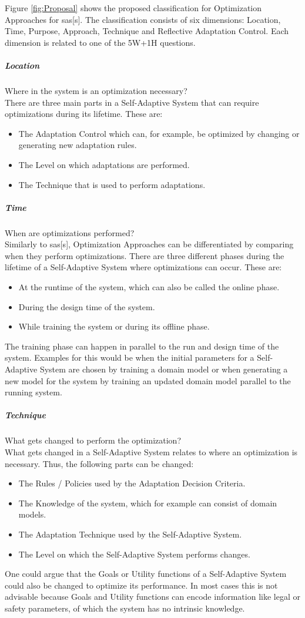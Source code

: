 \noindent Figure \ref{fig:Proposal} shows the proposed classification for Optimization Approaches for \acrlong{sas}[s].
The classification consists of six dimensions: Location, Time, Purpose, Approach, Technique and Reflective Adaptation Control.
Each dimension is related to one of the 5W+1H questions.

\subparagraph*{Location}
Where in the system is an optimization necessary? \\
There are three main parts in a Self-Adaptive System that can require optimizations during its lifetime.
These are:
\begin{itemize}[nosep]
    \item The Adaptation Control which can, for example, be optimized by changing or generating new adaptation rules.
    \item The Level on which adaptations are performed.
    \item The Technique that is used to perform adaptations.
\end{itemize}

\subparagraph*{Time}
When are optimizations performed? \\
Similarly to \acrlong{sas}[s], Optimization Approaches can be differentiated by comparing when they perform optimizations.
There are three different phases during the lifetime of a Self-Adaptive System where optimizations can occur.
These are:
\begin{itemize}[nosep]
    \item At the runtime of the system, which can also be called the online phase.
    \item During the design time of the system.
    \item While training the system or during its offline phase.
\end{itemize}
The training phase can happen in parallel to the run and design time of the system.
Examples for this would be when the initial parameters for a Self-Adaptive System are chosen by training a domain model
or when generating a new model for the system by training an updated domain model parallel to the running system.

\subparagraph*{Technique}
What gets changed to perform the optimization? \\
What gets changed in a Self-Adaptive System relates to where an optimization is necessary.
Thus, the following parts can be changed:
\begin{itemize}[nosep]
    \item The Rules / Policies used by the Adaptation Decision Criteria.
    \item The Knowledge of the system, which for example can consist of domain models.
    \item The Adaptation Technique used by the Self-Adaptive System.
    \item The Level on which the Self-Adaptive System performs changes.
\end{itemize}
One could argue that the Goals or Utility functions of a Self-Adaptive System could also be changed to optimize its performance.
In most cases this is not advisable because Goals and Utility functions can encode information
like legal or safety parameters, of which the system has no intrinsic knowledge.

